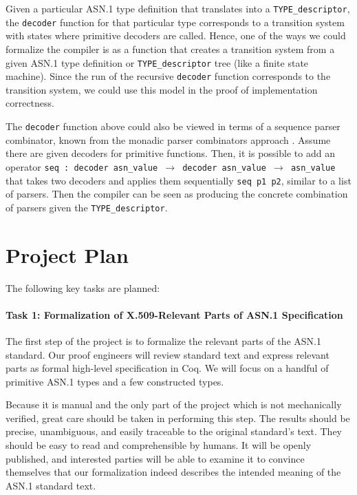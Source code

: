 \documentclass[acmsmall,nonacm]{acmart}
\begin{document}
 Given a particular ASN.1 type definition that translates into a
 \texttt{TYPE\_descriptor}, the \texttt{decoder} function for that
 particular type corresponds to a transition system with states where
 primitive decoders are called. Hence, one of the ways we could
 formalize the compiler is as a function that creates a transition
 system from a given ASN.1 type definition or \texttt{TYPE\_descriptor} tree (like a finite state machine). Since the run of the
 recursive \texttt{decoder} function corresponds to the transition
 system, we could use this model in the proof of implementation
 correctness.

 The \texttt{decoder} function above could also be viewed in terms
 of a sequence parser combinator, known from the monadic parser combinators
 approach \cite{MPC}. Assume there are given decoders for primitive
 functions. Then, it is possible to add an operator \texttt{seq : decoder
   asn\_value $\rightarrow$ decoder asn\_value $\rightarrow$ asn\_value} that takes two
 decoders and applies them sequentially \texttt{seq p1 p2}, similar to a
 list of parsers. Then the compiler can be seen as producing the
 concrete combination of parsers given the \texttt{TYPE\_descriptor}.

 \section{Project Plan}
The following key tasks are planned:
 
\paragraph{Task 1: Formalization of X.509-Relevant Parts of ASN.1 Specification}
The first step of the project is to formalize the relevant parts of the ASN.1 standard. Our proof engineers will review standard text and express relevant parts as formal high-level specification in Coq. We will focus on a handful of primitive ASN.1 types and a few constructed types.

Because it is manual and the only part of the project which is not mechanically verified, great care should be taken in performing this step. The results should be precise, unambiguous, and easily traceable to the original standard's text. They should be easy to read and comprehensible by humans. It will be openly published, and interested parties will be able to examine it to convince themselves that our formalization indeed describes the intended meaning of the ASN.1 standard text.
\end{document}
